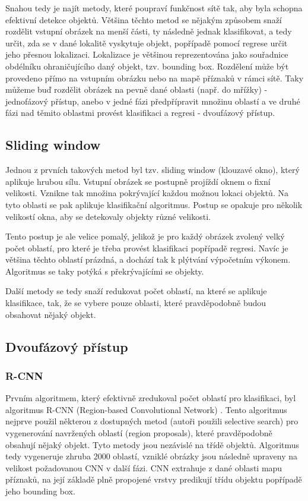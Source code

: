 Snahou tedy je najít metody, které poupraví funkčnost sítě tak, aby byla
schopna efektivní detekce objektů. Většina těchto metod se nějakým způsobem
snaží rozdělit vstupní obrázek na menší části, ty následně jednak klasifikovat,
a tedy určit, zda se v dané lokalitě vyskytuje objekt, popřípadě pomocí regrese
určit jeho přesnou lokalizaci. Lokalizace je většinou reprezentována jako
souřadnice obdélníku ohraničujícího daný objekt, tzv. bounding box. Rozdělení
může být provedeno přímo na vstupním obrázku nebo na mapě příznaků v rámci
sítě. Taky můžeme buď rozdělit obrázek na pevně dané oblasti (např. do mřížky)
- jednofázový přístup, anebo v jedné fázi předpřípravit množinu oblastí a ve
druhé fázi nad těmito oblastmi provést klasifikaci a regresi - dvoufázový
přístup.

\subsection{Sliding window}

Jednou z prvních takových metod byl tzv. sliding window (klouzavé okno), který
aplikuje hrubou sílu. Vstupní obrázek se postupně projíždí oknem o fixní
velikosti. Vznikne tak množina pokrývající každou možnou lokaci objektů. Na
tyto oblasti se pak aplikuje klasifikační algoritmus. Postup se opakuje pro
několik velikostí okna, aby se detekovaly objekty různé velikosti.

Tento postup je ale velice pomalý, jelikož je pro každý obrázek zvolený velký
počet oblastí, pro které je třeba provést klasifikaci popřípadě regresi. Navíc
je většina těchto oblastí prázdná, a dochází tak k plýtvání výpočetním výkonem.
Algoritmus se taky potýká s překrývajícími se objekty.

Další metody se tedy snaží redukovat počet oblastí, na které se aplikuje
klasifikace, tak, že se vybere pouze oblasti, které pravděpodobně budou
obsahovat nějaký objekt.

\subsection{Dvoufázový přístup}

\subsubsection*{R-CNN}
Prvním algoritmem, který efektivně zredukoval počet oblastí pro klasifikaci,
byl algoritmus R-CNN (Region-based Convolutional Network) \cite{r-cnn}. Tento
algoritmus nejprve použil některou z dostupných metod (autoři použili selective
search) pro vygenerování navržených oblastí (region proposals), které
pravděpodobně obsahují nějaký objekt. Tyto metody jsou nezávislé na třídě
objektů. Algoritmus tedy vygeneruje zhruba 2000 oblastí, vzniklé obrázky jsou
následně upraveny na velikost požadovanou CNN v další fázi. CNN extrahuje z
dané oblasti mapu příznaků, na její základě plně propojené vrstvy predikují
třídu objektu popřípadě jeho bounding box.

